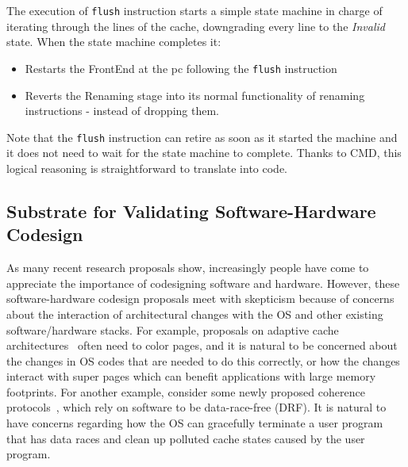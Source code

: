 \documentclass[conference]{IEEEtran}
\begin{document}
The execution of \verb|flush| instruction starts a simple state machine in
charge of iterating through the lines of the cache, downgrading every line to
the \emph{Invalid} state.
When the state machine completes it:
\begin{itemize}
\item Restarts the FrontEnd at the pc
following the \verb|flush| instruction
\item Reverts the Renaming stage into its normal functionality of renaming instructions - instead of dropping them.
\end{itemize}
Note that the \verb|flush| instruction can retire as soon as it started the
machine and it does not need to wait for the state machine to complete.
Thanks to CMD, this logical reasoning is straightforward to translate into code.


\subsection{Substrate for Validating Software-Hardware Codesign}

As many recent research proposals show, increasingly people have come to appreciate the importance of codesigning software and hardware.
However, these software-hardware codesign proposals meet with skepticism because of concerns about the interaction of architectural changes with the OS and other existing software/hardware stacks.
For example, proposals on adaptive cache architectures~\cite{Jigsaw} often need to color pages, and it is natural to be concerned about the changes in OS codes that are needed to do this correctly, or how the changes interact with super pages which can benefit applications with large memory footprints.
For another example, consider some newly proposed coherence protocols~\cite{DeNoVo}, which rely on software to be data-race-free (DRF). It is natural to have concerns regarding how the OS can gracefully terminate a user program that has data races and clean up polluted cache states caused by the user program.
\end{document}
